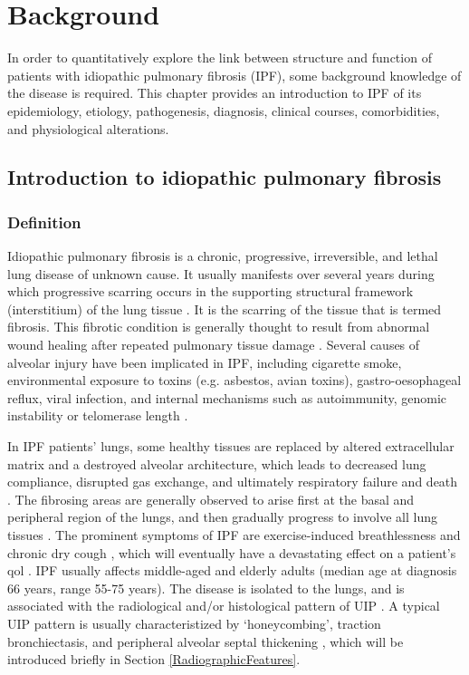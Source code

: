\chapter{Background} \label{Yuwen_Background}
In order to quantitatively explore the link between structure and function of patients with idiopathic pulmonary fibrosis (IPF), some background knowledge of the disease is required. This chapter provides an introduction to IPF of its epidemiology, etiology, pathogenesis, diagnosis, clinical courses, comorbidities, and physiological alterations.

\section{Introduction to idiopathic pulmonary fibrosis} 
\subsection{Definition} 
Idiopathic pulmonary fibrosis is a chronic, progressive, irreversible, and lethal lung disease of unknown cause. It usually manifests over several years during which progressive scarring occurs in the supporting structural framework (interstitium) of the lung tissue \citep{meltzer2008idiopathic, raghu2011official}. It is the scarring of the tissue that is termed fibrosis. This fibrotic condition is generally thought to result from abnormal wound healing after repeated pulmonary tissue damage \citep{king2011idiopathic}. Several causes of alveolar injury have been implicated in IPF, including cigarette smoke, environmental exposure to toxins (e.g. asbestos, avian toxins), gastro-oesophageal reflux, viral infection, and internal mechanisms such as autoimmunity, genomic instability or telomerase length \citep{raghu2011official, ahluwalia2014new}.

In IPF patients' lungs, some healthy tissues are replaced by altered extracellular matrix and a destroyed alveolar architecture, which leads to decreased lung compliance, disrupted gas exchange, and ultimately respiratory failure and death \citep{richeldi2017idiopathic}. The fibrosing areas are generally observed to arise first at the basal and peripheral region of the lungs, and then gradually progress to involve all lung tissues \citep{martinez2017idiopathic}. The prominent symptoms of IPF are exercise-induced breathlessness and chronic dry cough \citep{meltzer2008idiopathic}, which will eventually have a devastating effect on a patient’s \gls{qol} \citep{kim2015natural}. IPF usually affects middle-aged and elderly adults (median age at diagnosis 66 years, range 55-75 years). The disease is isolated to the lungs, and is associated with the radiological and/or histological pattern of UIP \citep{king2011idiopathic,raghu2011official,xaubet2017idiopathic}. A typical UIP pattern is usually characteristized by ‘honeycombing’, traction bronchiectasis, and peripheral alveolar septal thickening \citep{martinez2017idiopathic}, which will be introduced briefly in Section \ref{RadiographicFeatures}.

